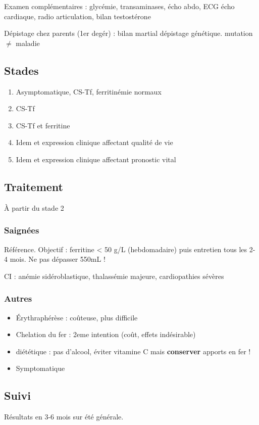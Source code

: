 \documentclass[11pt]{article}
\begin{document}
Examen complémentaires : glycémie, transaminases, écho abdo, ECG \textpm{} écho
cardiaque, radio articulation, bilan testostérone

Dépistage chez parents (1er degér) : bilan martial \textpm{} dépistage
génétique. \danger mutation \(\neq\) maladie

\subsection{Stades}
\label{sec:org501bf4c}
\begin{enumerate}
\item Asymptomatique, CS-Tf, ferritinémie normaux
\item CS-Tf \inc
\item CS-Tf \inc et ferritine \inc
\item Idem et expression clinique affectant qualité de vie
\item Idem et expression clinique affectant pronostic vital
\end{enumerate}

\subsection{Traitement}
\label{sec:org5a3b8f4}
À partir du stade 2

\subsubsection{Saignées}
\label{sec:org203f547}
Référence. Objectif : ferritine < 50 g/L (hebdomadaire) puis entretien tous les
  2-4 mois. Ne pas dépasser 550mL !

CI : anémie sidéroblastique, thalassémie majeure, cardiopathies sévères

\subsubsection{Autres}
\label{sec:org7911539}
\begin{itemize}
\item Érythraphérèse : coûteuse, plus difficile
\item Chelation du fer : 2eme intention (coût, effets indésirable)
\item diététique : pas d'alcool, éviter vitamine C mais \textbf{conserver} apports en fer !
\item Symptomatique
\end{itemize}

\subsection{Suivi}
\label{sec:org0c25c31}
Résultats en 3-6 mois sur été générale. 
\end{document}
